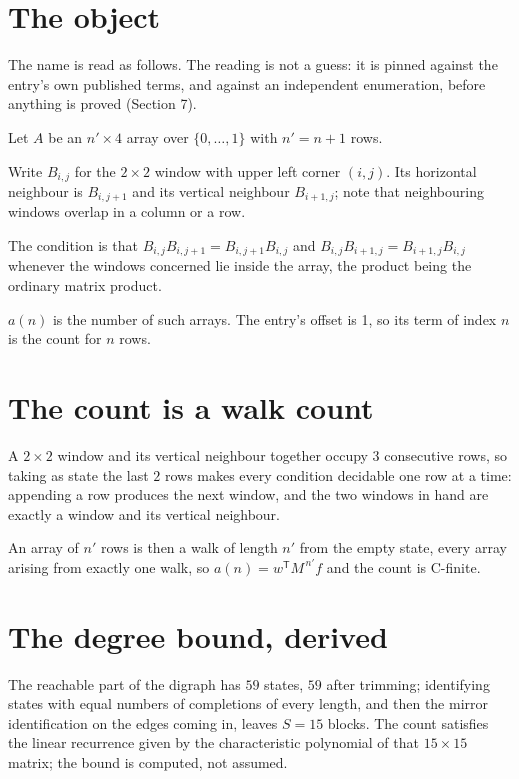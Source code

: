 \documentclass[11pt]{article}
\theoremstyle{definition}
\begin{document}
\section{The object}

The name is read as follows. The reading is not a guess: it is pinned against the entry's own published terms, and against an independent enumeration, before anything is proved (Section 7).

Let $A$ be an $n' \times 4$ array over $\{0,\dots,1\}$ with $n' = n + 1$ rows.

Write $B_{i,j}$ for the $2\times2$ window with upper left corner $(i,j)$. Its horizontal neighbour is $B_{i,j+1}$ and its vertical neighbour $B_{i+1,j}$; note that neighbouring windows overlap in a column or a row.

The condition is that $B_{i,j}B_{i,j+1} = B_{i,j+1}B_{i,j}$ and $B_{i,j}B_{i+1,j} = B_{i+1,j}B_{i,j}$ whenever the windows concerned lie inside the array, the product being the ordinary matrix product.

$a(n)$ is the number of such arrays. The entry's offset is 1, so its term of index $n$ is the count for $n$ rows.

\section{The count is a walk count}

A $2\times2$ window and its vertical neighbour together occupy $3$ consecutive rows, so taking as state the last $2$ rows makes every condition decidable one row at a time: appending a row produces the next window, and the two windows in hand are exactly a window and its vertical neighbour.

An array of $n'$ rows is then a walk of length $n'$ from the empty state, every array arising from exactly one walk, so $a(n) = w^{\mathsf T}M^{\,n'}f$ and the count is C-finite.

\section{The degree bound, derived}

The reachable part of the digraph has $59$ states, $59$ after trimming; identifying states with equal numbers of completions of every length, and then the mirror identification on the edges coming in, leaves $S = 15$ blocks. The count satisfies the linear recurrence given by the characteristic polynomial of that $15\times15$ matrix; the bound is computed, not assumed.
\end{document}
